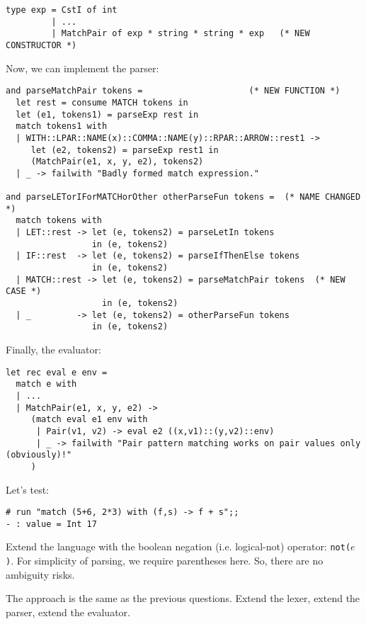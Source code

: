 \documentclass[addpoints]{exam}
\begin{document}
\begin{questions}
\begin{solution}
    \begin{verbatim}
type exp = CstI of int
         | ...
         | MatchPair of exp * string * string * exp   (* NEW CONSTRUCTOR *)
    \end{verbatim}

    Now, we can implement the parser:

    \begin{verbatim}
and parseMatchPair tokens =                     (* NEW FUNCTION *)
  let rest = consume MATCH tokens in
  let (e1, tokens1) = parseExp rest in
  match tokens1 with
  | WITH::LPAR::NAME(x)::COMMA::NAME(y)::RPAR::ARROW::rest1 ->
     let (e2, tokens2) = parseExp rest1 in
     (MatchPair(e1, x, y, e2), tokens2)
  | _ -> failwith "Badly formed match expression."

and parseLETorIForMATCHorOther otherParseFun tokens =  (* NAME CHANGED *)
  match tokens with
  | LET::rest -> let (e, tokens2) = parseLetIn tokens
                 in (e, tokens2)
  | IF::rest  -> let (e, tokens2) = parseIfThenElse tokens
                 in (e, tokens2)
  | MATCH::rest -> let (e, tokens2) = parseMatchPair tokens  (* NEW CASE *)
                   in (e, tokens2)
  | _         -> let (e, tokens2) = otherParseFun tokens
                 in (e, tokens2)
    \end{verbatim}

    Finally, the evaluator:

    \begin{verbatim}
let rec eval e env =
  match e with
  | ...
  | MatchPair(e1, x, y, e2) ->
     (match eval e1 env with
      | Pair(v1, v2) -> eval e2 ((x,v1)::(y,v2)::env)
      | _ -> failwith "Pair pattern matching works on pair values only (obviously)!"
     )
    \end{verbatim}

    
    Let's test:
    \begin{verbatim}
# run "match (5+6, 2*3) with (f,s) -> f + s";; 
- : value = Int 17
    \end{verbatim}
  \end{solution}


  
  \question
  Extend the language with
  the boolean negation (i.e. logical-not) operator: \texttt{not($e$)}.
  For simplicity of parsing, we require parentheses here.
  So, there are no ambiguity risks.


  \begin{solution}
    The approach is the same as the previous questions.
    Extend the lexer, extend the parser, extend the evaluator.


\end{solution}
\end{questions}
\end{document}
